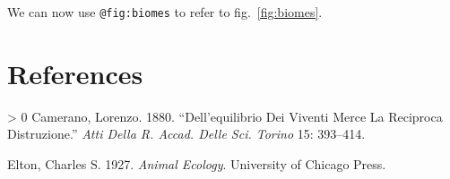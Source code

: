 \documentclass[12pt]{article}
\newlength{\cslhangindent}
\newenvironment{CSLReferences}[3] %
 {%
  \setlength{\parindent}{0pt}
  \ifodd #1 \everypar{\setlength{\hangindent}{\cslhangindent}}\ignorespaces\fi
  \ifnum #2 > 0
  \setlength{\parskip}{#2\baselineskip}
  \fi
 }%
 {}
\begin{document}
We can now use \texttt{@fig:biomes} to refer to fig.~\ref{fig:biomes}.

\hypertarget{references}{%
\section*{References}\label{references}}

\hypertarget{refs}{}
\begin{CSLReferences}{1}{0}
\leavevmode\hypertarget{ref-Camerano1880EquViv}{}%
Camerano, Lorenzo. 1880. {``Dell'equilibrio Dei Viventi Merce La
Reciproca Distruzione.''} \emph{Atti Della R. Accad. Delle Sci. Torino}
15: 393--414.

\leavevmode\hypertarget{ref-Elton1927AniEco}{}%
Elton, Charles S. 1927. \emph{Animal Ecology}. University of Chicago
Press.

\end{CSLReferences}
\end{document}
